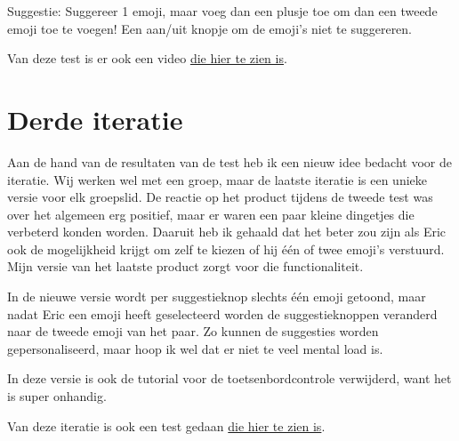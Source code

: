 \documentclass[12pt]{article}
\begin{document}
Suggestie:
Suggereer 1 emoji, maar voeg dan een plusje toe om dan een tweede emoji toe te voegen!
Een aan/uit knopje om de emoji's niet te suggereren.

Van deze test is er ook een video \href{https://www.youtube.com/watch?v=Xwmjzj9Me2I}{die hier te zien is}.

\clearpage\section{Derde iteratie}

Aan de hand van de resultaten van de test heb ik een nieuw idee bedacht voor de iteratie.
Wij werken wel met een groep, maar de laatste iteratie is een unieke versie voor elk groepslid.
De reactie op het product tijdens de tweede test was over het algemeen erg positief, maar er waren een paar kleine dingetjes die verbeterd konden worden.
Daaruit heb ik gehaald dat het beter zou zijn als Eric ook de mogelijkheid krijgt om zelf te kiezen of hij één of twee emoji's verstuurd.
Mijn versie van het laatste product zorgt voor die functionaliteit.

In de nieuwe versie wordt per suggestieknop slechts één emoji getoond, maar nadat Eric een emoji heeft geselecteerd worden de suggestieknoppen veranderd naar de tweede emoji van het paar.
Zo kunnen de suggesties worden gepersonaliseerd, maar hoop ik wel dat er niet te veel mental load is.

In deze versie is ook de tutorial voor de toetsenbordcontrole verwijderd, want het is super onhandig.

Van deze iteratie is ook een test gedaan \href{https://youtube.com/shorts/IZRY7AdJLQE}{die hier te zien is}.


\end{document}

